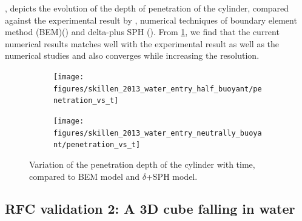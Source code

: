 \documentclass[preprint,12pt]{elsarticle}
\begin{document}
, depicts the evolution of the
depth of penetration of the cylinder, compared against the experimental result
by \citet{greenhow1983nonlinear}, numerical techniques of boundary element
method (BEM)(\cite{sun2006water}) and delta-plus SPH
(\cite{sun2018accurate}). From \cref{fig:result_rfc_01_result_displacement},
we find that the current numerical results matches well with the experimental result as
well as the numerical studies and also converges while increasing the
resolution.
\begin{figure}[!htpb]
  \centering
  \begin{subfigure}{0.48\textwidth}
    \centering
    \texttt{[image: figures/skillen\_2013\_water\_entry\_half\_buoyant/penetration\_vs\_t]}
  \end{subfigure}
  \begin{subfigure}{0.48\textwidth}
    \centering
    \texttt{[image: figures/skillen\_2013\_water\_entry\_neutrally\_buoyant/penetration\_vs\_t]}
  \end{subfigure}
  \caption{Variation of the penetration depth of the cylinder with time,
    compared to BEM model \cite{sun2006water} and $\delta$+SPH model\cite{sun2018accurate}.}
\label{fig:result_rfc_01_result_displacement}
\end{figure}


\FloatBarrier%
\subsection{RFC validation 2: A 3D cube falling in water}
\label{sec:rfc_validation_2_falling_solid_in_water}
\end{document}
